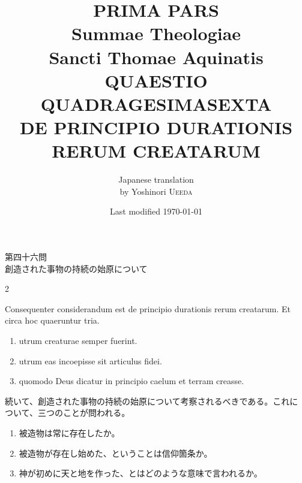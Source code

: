 \documentclass[paper=a4paper,fontsize=10pt,jafontsize=9pt,titlepage]{jlreq}
\title{{\bfseries PRIMA PARS}\\{\Huge Summae Theologiae}\\Sancti Thomae
Aquinatis\\{\sffamily QUAESTIO QUADRAGESIMASEXTA}\\DE PRINCIPIO
DURATIONIS RERUM CREATARUM}
\author{Japanese translation\\by Yoshinori {\scshape Ueeda}}
\date{Last modified \today}
\begin{document}
\maketitle

\begin{center}
{\Large 第四十六問\\創造された事物の持続の始原について}
\end{center}

\begin{paracol}{2}

Consequenter considerandum est de principio durationis rerum
 creatarum. Et circa hoc quaeruntur tria. 

\begin{enumerate}
 \item utrum creaturae semper fuerint. 
 \item utrum eas incoepisse sit articulus fidei. 
 \item quomodo Deus dicatur in principio caelum et terram creasse.
\end{enumerate}


\switchcolumn


続いて、創造された事物の持続の始原について考察されるべきである。これに
ついて、三つのことが問われる。
\begin{enumerate}
 \item 被造物は常に存在したか。
 \item 被造物が存在し始めた、ということは信仰箇条か。
 \item 神が初めに天と地を作った、とはどのような意味で言われるか。
\end{enumerate}


\switchcolumn*



\end{paracol}


\newpage
{}

{}
\setcounter{section}{46}
\setcounter{subsection}{0}
\end{document}
